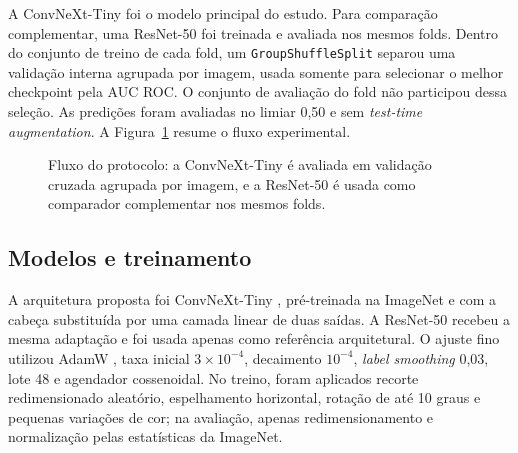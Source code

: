 A ConvNeXt-Tiny foi o modelo principal do estudo. Para comparação complementar,
uma ResNet-50 foi treinada e avaliada nos mesmos folds. Dentro do conjunto de
treino de cada fold, um \texttt{GroupShuffleSplit} separou uma validação interna
agrupada por imagem, usada somente para selecionar o melhor checkpoint pela AUC
ROC. O conjunto de avaliação do fold não participou dessa seleção. As predições
foram avaliadas no limiar 0,50 e sem \emph{test-time augmentation}. A
Figura~\ref{fig:pipeline} resume o fluxo experimental.

\begin{figure}[ht]
\centering
{}
\caption{Fluxo do protocolo: a ConvNeXt-Tiny é avaliada em validação cruzada
agrupada por imagem, e a ResNet-50 é usada como comparador complementar nos
mesmos folds.}
\label{fig:pipeline}
\end{figure}

\subsection{Modelos e treinamento}

A arquitetura proposta foi ConvNeXt-Tiny \cite{liu2022convnext}, pré-treinada
na ImageNet \cite{deng2009imagenet} e com a cabeça substituída por uma camada
linear de duas saídas. A ResNet-50 \cite{he2016resnet} recebeu a mesma adaptação
e foi usada apenas como referência arquitetural. O ajuste fino utilizou AdamW
\cite{loshchilov2019adamw}, taxa inicial $3\times10^{-4}$, decaimento
$10^{-4}$, \emph{label smoothing} 0,03, lote 48 e agendador cossenoidal. No
treino, foram aplicados recorte redimensionado aleatório, espelhamento
horizontal, rotação de até 10 graus e pequenas variações de cor; na avaliação,
apenas redimensionamento e normalização pelas estatísticas da ImageNet.

